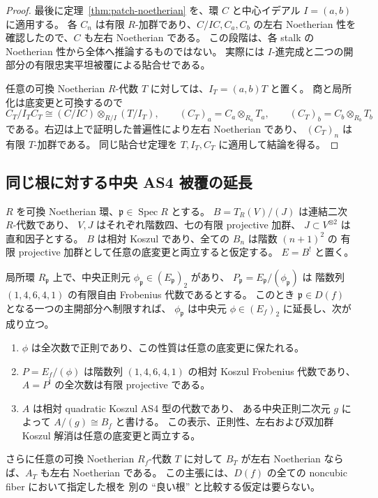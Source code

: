 \begin{proof}
最後に定理~\ref{thm:patch-noetherian} を、環 $C$ と中心イデアル
$I=(a,b)$ に適用する。
各 $C_n$ は有限 $R$-加群であり、$C/IC,C_a,C_b$ の左右 Noetherian 性を
確認したので、$C$ も左右 Noetherian である。
この段階は、各 stalk の Noetherian 性から全体へ推論するものではない。
実際には $I$-進完成と二つの開部分の有限忠実平坦被覆による貼合せである。

任意の可換 Noetherian $R$-代数 $T$ に対しては、$I_T=(a,b)T$ と置く。
商と局所化は底変更と可換するので
\[
 C_T/I_TC_T\cong(C/IC)\otimes_{R/I}(T/I_T),
 \qquad (C_T)_a=C_a\otimes_{R_a}T_a,
 \qquad (C_T)_b=C_b\otimes_{R_b}T_b
\]
である。右辺は上で証明した普遍性により左右 Noetherian であり、
$(C_T)_n$ は有限 $T$-加群である。
同じ貼合せ定理を $T,I_T,C_T$ に適用して結論を得る。
\end{proof}

\subsection{同じ根に対する中央 AS4 被覆の延長}

\begin{lemma}[局所中央被覆の有限型近傍への延長]
\label{lem:spread-local-central-hull}
$R$ を可換 Noetherian 環、$\mathfrak p\in\operatorname{Spec}R$ とする。
$B=T_R(V)/(J)$ は連結二次 $R$-代数であり、
$V,J$ はそれぞれ階数四、七の有限 projective 加群、
$J\subset V^{\otimes2}$ は直和因子とする。
$B$ は相対 Koszul であり、全ての $B_n$ は階数 $(n+1)^2$ の
有限 projective 加群として任意の底変更と両立すると仮定する。
$E=B^!$ と置く。

局所環 $R_{\mathfrak p}$ 上で、中央正則元
$\phi_{\mathfrak p}\in(E_{\mathfrak p})_2$ があり、
$P_{\mathfrak p}=E_{\mathfrak p}/(\phi_{\mathfrak p})$ は
階数列 $(1,4,6,4,1)$ の有限自由 Frobenius 代数であるとする。
このとき $\mathfrak p\in D(f)$ となる一つの主開部分へ制限すれば、
$\phi_{\mathfrak p}$ は中央元 $\phi\in(E_f)_2$ に延長し、次が成り立つ。
\begin{enumerate}
\item $\phi$ は全次数で正則であり、この性質は任意の底変更に保たれる。
\item $P=E_f/(\phi)$ は階数列 $(1,4,6,4,1)$ の相対 Koszul
  Frobenius 代数であり、$A=P^!$ の全次数は有限 projective である。
\item $A$ は相対 quadratic Koszul AS4 型の代数であり、
  ある中央正則二次元 $g$ によって $A/(g)\cong B_f$ と書ける。
  この表示、正則性、左右および双加群 Koszul 解消は任意の底変更と両立する。
\end{enumerate}
さらに任意の可換 Noetherian $R_f$-代数 $T$ に対して $B_T$ が左右 Noetherian
ならば、$A_T$ も左右 Noetherian である。
この主張には、$D(f)$ の全ての noncubic fiber において指定した根を
別の ``良い根'' と比較する仮定は要らない。
\end{lemma}

